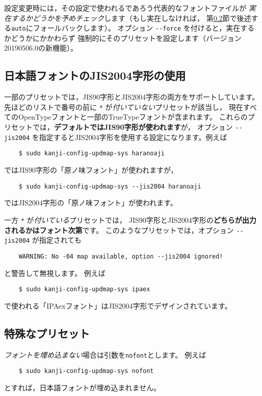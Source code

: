 \documentclass{jlreq}
\def\command#1{\texttt{#1}}
\def\option#1{\texttt{-{}-#1}}
\begin{document}
設定変更時には，その設定で使われるであろう代表的なフォントファイルが
\emph{実在するかどうかを予めチェック}します（もし実在しなければ，
第\ref{special-preset}節で後述する\command{auto}にフォールバックします）。
オプション \option{force} を付けると，実在するかどうかにかかわらず
強制的にそのプリセットを設定します（バージョン20190506.0の新機能）。

\subsection{日本語フォントのJIS2004字形の使用}\label{jis2004}

一部のプリセットでは，JIS90字形とJIS2004字形の両方をサポートしています。
先ほどのリストで番号の前に \command{*} が\emph{付いていない}プリセットが該当し，
現在すべてのOpenTypeフォントと一部のTrueTypeフォントが含まれます。
これらのプリセットでは，\textbf{デフォルトではJIS90字形が使われます}が，
オプション \option{jis2004} を指定するとJIS2004字形を使用する設定になります。例えば
\begin{verbatim}
    $ sudo kanji-config-updmap-sys haranoaji
\end{verbatim}
ではJIS90字形の「原ノ味フォント」が使われますが，
\begin{verbatim}
    $ sudo kanji-config-updmap-sys --jis2004 haranoaji
\end{verbatim}
ではJIS2004字形の「原ノ味フォント」が使われます。

一方 \command{*} が\emph{付いている}プリセットでは，
JIS90字形とJIS2004字形の\textbf{どちらが出力されるかはフォント次第}です。
このようなプリセットでは，オプション \option{jis2004} が指定されても
\begin{verbatim}
    WARNING: No -04 map available, option --jis2004 ignored!
\end{verbatim}
と警告して無視します。
例えば
\begin{verbatim}
    $ sudo kanji-config-updmap-sys ipaex
\end{verbatim}
で使われる「IPAexフォント」はJIS2004字形でデザインされています。

\subsection{特殊なプリセット}\label{special-preset}

\emph{フォントを埋め込まない}場合は引数を\command{nofont}とします。
例えば
\begin{verbatim}
    $ sudo kanji-config-updmap-sys nofont
\end{verbatim}
とすれば，日本語フォントが埋め込まれません。
\end{document}
